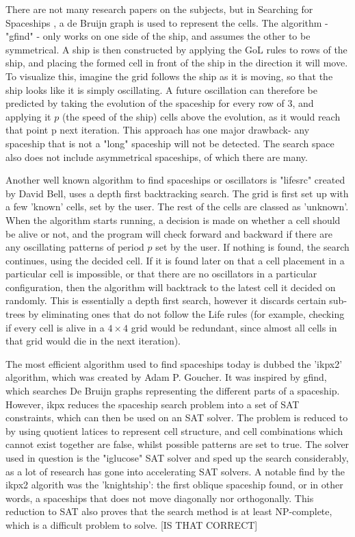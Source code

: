 \documentclass{l4proj}
\begin{document}
There are not many research papers on the subjects, but in Searching for Spaceships \cite{searching_for_spaceships}, a de Bruijn graph is used to represent the cells. The algorithm - "gfind" - only works on one side of the ship, and assumes the other to be symmetrical. A ship is then constructed by applying the GoL rules to rows of the ship, and placing the formed cell in front of the ship in the direction it will move. To visualize this, imagine the grid follows the ship as it is moving, so that the ship looks like it is simply oscillating. A future oscillation can therefore be predicted by taking the evolution of the spaceship for every row of 3, and applying it $p$ (the speed of the ship) cells above the evolution, as it would reach that point p next iteration. This approach has one major drawback- any spaceship that is not a "long" spaceship will not be detected. The search space also does not include asymmetrical spaceships, of which there are many.

Another well known algorithm to find spaceships or oscillators is "lifesrc" created by David Bell, uses a depth first backtracking search. The grid is first set up with a few 'known' cells, set by the user. The rest of the cells are classed as 'unknown'. When the algorithm starts running, a decision is made on whether a cell should be alive or not, and the program will check forward and backward if there are any oscillating patterns of period $p$ set by the user. If nothing is found, the search continues, using the decided cell. If it is found later on that a cell placement in a particular cell is impossible, or that there are no oscillators in a particular configuration, then the algorithm will backtrack to the latest cell it decided on randomly. This is essentially a depth first search, however it discards certain sub-trees by eliminating ones that do not follow the Life rules (for example, checking if every cell is alive in a $4 \times 4$ grid would be redundant, since almost all cells in that grid would die in the next iteration). 

The most efficient algorithm used to find spaceships today is dubbed the 'ikpx2' algorithm, which was created by Adam P. Goucher. It was inspired by gfind, which searches De Bruijn graphs representing the different parts of a spaceship. However, ikpx reduces the spaceship search problem into a set of SAT constraints, which can then be used on an SAT solver. The problem is reduced to by using quotient latices to represent cell structure, and cell combinations which cannot exist together are false, whilst possible patterns are set to true. The solver used in question is the "iglucose" \cite{sat_2018} SAT solver and sped up the search considerably, as a lot of research has gone into accelerating SAT solvers. A notable find by the ikpx2 algorith was the 'knightship': the first oblique spaceship found, or in other words, a spaceships that does not move diagonally nor orthogonally. This reduction to SAT also proves that the search method is at least NP-complete, which is a difficult problem to solve.
[IS THAT CORRECT]
\end{document}
